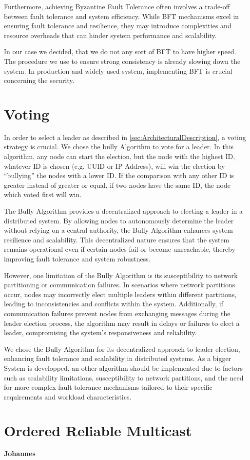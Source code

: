 Furthermore, achieving Byzantine Fault Tolerance often involves a trade-off between fault tolerance and system efficiency. While BFT mechanisms excel in ensuring fault tolerance and resilience, they may introduce complexities and resource overheads that can hinder system performance and scalability.

In our case we decided, that we do not any sort of \ac{BFT} to have higher speed. The procedure we use to ensure strong consistency is already slowing down the system. In production and widely used system, implementing \ac{BFT} is crucial concerning the security.
\section{Voting}\label{sec:Voting}
In order to select a leader as described in \ref{sec:ArchitecturalDescription}, a voting strategy is crucial. We chose the bully Algorithm to vote for a leader. In this algorithm, any node can start the election, but the node with the highest ID, whatever ID is chosen (e.g. \ac{UUID} or IP Address), will win 
the election by \enquote{bullying} the nodes with a lower ID. If the comparison with any other ID is greater instead of greater or equal, if two nodes have the same ID, the node which voted first will win.

The Bully Algorithm provides a decentralized approach to electing a leader in a distributed system. By allowing nodes to autonomously determine the leader without relying on a central authority, the Bully Algorithm enhances system resilience and scalability. This decentralized nature ensures that the system remains operational even if certain nodes fail or become unreachable, thereby improving fault tolerance and system robustness.

However, one limitation of the Bully Algorithm is its susceptibility to network partitioning or communication failures. In scenarios where network partitions occur, nodes may incorrectly elect multiple leaders within different partitions, leading to inconsistencies and conflicts within the system. Additionally, if communication failures prevent nodes from exchanging messages during the leader election process, the algorithm may result in delays or failures to elect a leader, compromising the system's responsiveness and reliability.

We chose the Bully Algorithm for its decentralized approach to leader election, enhancing fault tolerance and scalability in distributed systems. As a bigger System is developped, an other algorithm should be implemented due to factors such as scalability limitations, susceptibility to network partitions, and the need for more complex fault tolerance mechanisms tailored to their specific requirements and workload characteristics.

\section{Ordered Reliable Multicast}\label{sec:OrderedReliableMulticast}
\textbf{Johannes}
